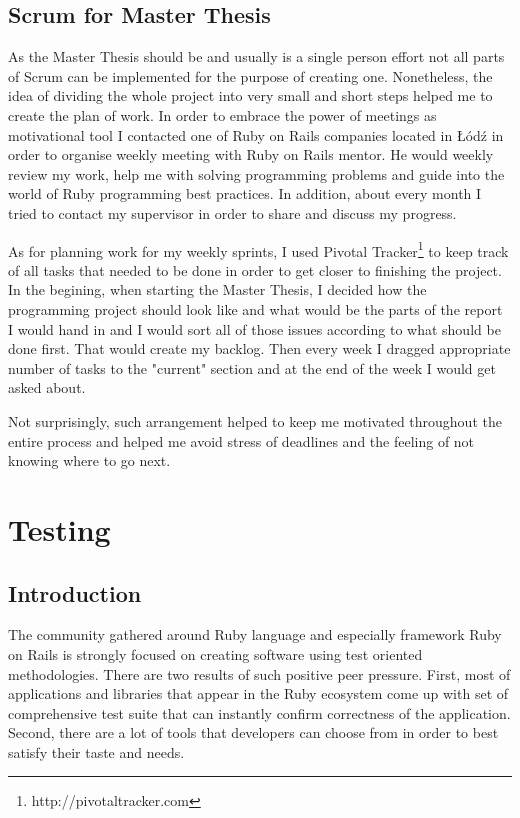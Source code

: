     \subsection{Scrum for Master Thesis}
      As the Master Thesis should be and usually is a single person effort not all parts of Scrum can be
      implemented for the purpose of creating one. Nonetheless, the idea of dividing the whole project
      into very small and short steps helped me to create the plan of work. In order to
      embrace the power of meetings as motivational tool I contacted one of Ruby on Rails companies located
      in Łódź in order to organise weekly meeting with Ruby on Rails mentor. He would weekly review my
      work, help me with solving programming problems and guide into the world of Ruby programming best practices.
      In addition, about every month I tried to contact my supervisor in order to share and discuss my progress.

      As for planning work for my weekly sprints, I used Pivotal Tracker\footnote{http://pivotaltracker.com}
      to keep track of all tasks that needed to be done in order to get closer to finishing the project.
      In the begining, when starting the Master Thesis, I decided how the programming project should look like and what
      would be the parts of the report I would hand in and I would sort all of those issues according to
      what should be done first. That would create my backlog. Then every week I dragged appropriate number of tasks
      to the "current" section and at the end of the week I would get asked about.

      Not surprisingly, such arrangement helped to keep me motivated throughout the entire process and
      helped me avoid stress of deadlines and the feeling of not knowing where to go next.

  \section{Testing}
    \subsection{Introduction}
      The community gathered around Ruby language and especially framework Ruby on Rails is strongly
      focused on creating software using test oriented methodologies. There are two results of such positive peer pressure.
      First, most of applications and libraries that appear in the Ruby ecosystem come up with set of comprehensive
      test suite that can instantly confirm correctness of the application. Second, there are a lot of tools
      that developers can choose from in order to best satisfy their taste and needs.
    
